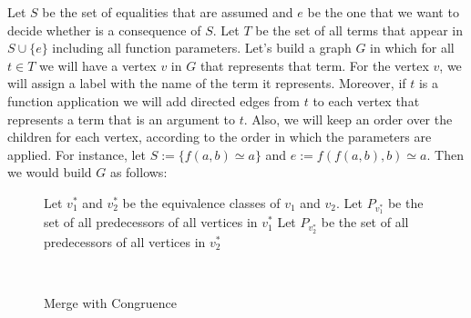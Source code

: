 
Let $S$ be the set of equalities that are assumed and $e$ be the one that we want to decide whether is a consequence of $S$. Let $T$ be the set of all terms that appear in $S \cup \{e\}$ including all function parameters. Let's build a graph $G$ in which for all $t \in T$ we will have a vertex $v$ in $G$ that represents that term. For the vertex $v$, we will assign a label with the name of the term it represents. Moreover, if $t$ is a function application we will add directed edges from $t$ to each vertex that represents a term that is an argument to $t$. Also, we will keep an order over the children for each vertex, according to the order in which the parameters are applied. For instance, let $S := \{f(a, b) \simeq a\}$ and $e := f(f(a, b), b) \simeq a$. Then we would build $G$ as follows:

\renewcommand{\algorithmicforall}{\textbf{for each}}
\MakeRobust{\Call}

\begin{figure}[t]
\begin{algorithmic}[1]
    \State Let $v_{1}^{*}$ and $v_{2}^{*}$ be the equivalence classes of $v_{1}$ and $v_{2}$.
    \State Let $P_{v_{1}^{*}}$ be the set of all predecessors of all vertices in $v_{1}^{*}$
    \State Let $P_{v_{2}^{*}}$ be the set of all predecessors of all vertices in $v_{2}^{*}$
    \State{}
        \State {}
      \EndIf
    \EndFor
  \EndIf
  \EndProcedure
\end{algorithmic}
\caption{Merge with Congruence}~\label{merge_cong}
\end{figure}

\begin{figure}[h]
\centering
{}
\end{figure}

